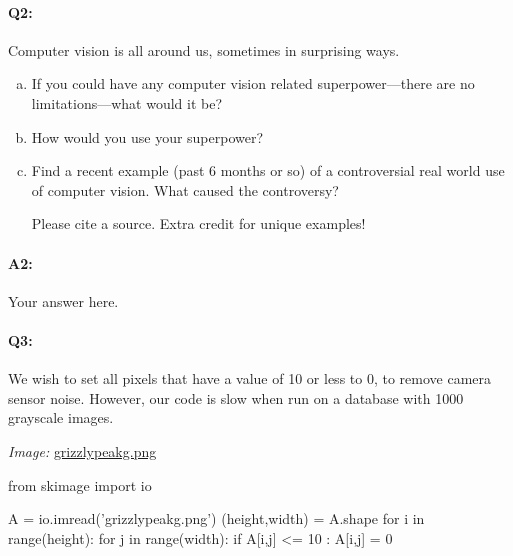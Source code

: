 \documentclass[11pt]{article}
\begin{document}

\pagebreak

\paragraph{Q2:}
Computer vision is all around us, sometimes in surprising ways.
\begin{enumerate}[(a)]

\item
If you could have any computer vision related superpower---there are no limitations---what would it be?

\item
How would you use your superpower?

\item Find a recent example (past 6 months or so) of a controversial real world use of computer vision. What caused the controversy?

Please cite a source. Extra credit for unique examples!
\end{enumerate}

\paragraph{A2:} Your answer here.








\pagebreak
\paragraph{Q3:} We wish to set all pixels that have a value of 10 or less to 0, to remove camera sensor noise. However, our code is slow when run on a database with 1000 grayscale images.

\emph{Image:} \href{grizzlypeakg.png}{grizzlypeakg.png}

\begin{python}
from skimage import io

A = io.imread('grizzlypeakg.png')
(height,width) = A.shape
for i in range(height):
    for j in range(width):
        if A[i,j] <= 10 :
            A[i,j] = 0
\end{python}
\end{document}
